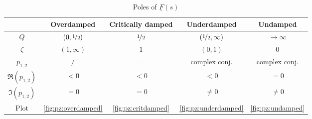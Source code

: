 \documentclass{article}[11pt]
\begin{document}
\begin{table}[H]
  \centering
  \caption{Poles of $\underline{F}(s)$}
  \begin{tabular}{ccccc}
  \toprule
                           & \textbf{Overdamped}               & \textbf{Critically damped} & \textbf{Underdamped}                    & \textbf{Undamped}     \\ \midrule
  $Q$                       & $\left(0, \nicefrac{1}{2}\right)$ & $\nicefrac{1}{2}$          & $\left(\nicefrac{1}{2}, \infty\right)$ & $\rightarrow \infty$  \\ 
  $\zeta$                   & $\left(1, \infty\right)$          & $1$                        & $\left(0, 1\right)$                    & $0$                   \\ \hline
  $p_{1,2}$                 & $\neq$                            & $=$                        & complex conj.                          & complex conj.         \\
  $\Re\left(p_{1,2}\right)$ & $<0$                              & $<0$                       & $<0$                                   & $=0$                  \\
  $\Im\left(p_{1,2}\right)$ & $=0$                              & $=0$                       & $\neq0$                                & $\neq0$               \\
  Plot                      & \ref{fig:pz:overdamped}           & \ref{fig:pz:critdamped}    & \ref{fig:pz:underdamped}               & \ref{fig:pz:undamped} \\ \toprule
  \end{tabular}
  \label{tab:pz}
\end{table}
\end{document}
